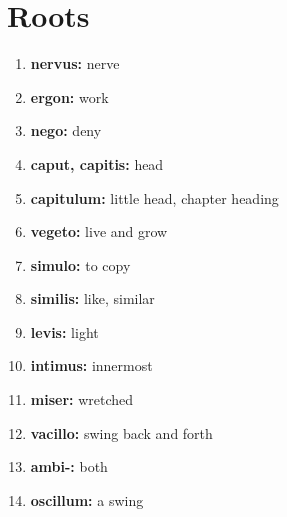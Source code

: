 \documentclass{article}
\begin{document}
\section{Roots}
\begin{enumerate}
    \item \textbf{nervus: }{nerve}
    \item \textbf{ergon: }{work}
    \item \textbf{nego: }{deny}
    \item \textbf{caput, capitis: }{head}
    \item \textbf{capitulum: }{little head, chapter heading}
    \item \textbf{vegeto: }{live and grow}
    \item \textbf{simulo: }{to copy}
    \item \textbf{similis: }{like, similar}
    \item \textbf{levis: }{light}
    \item \textbf{intimus: }{innermost}
    \item \textbf{miser: }{wretched}
    \item \textbf{vacillo: }{swing back and forth}
    \item \textbf{ambi-: }{both}
    \item \textbf{oscillum: }{a swing}
    
\end{enumerate}
\end{document}
